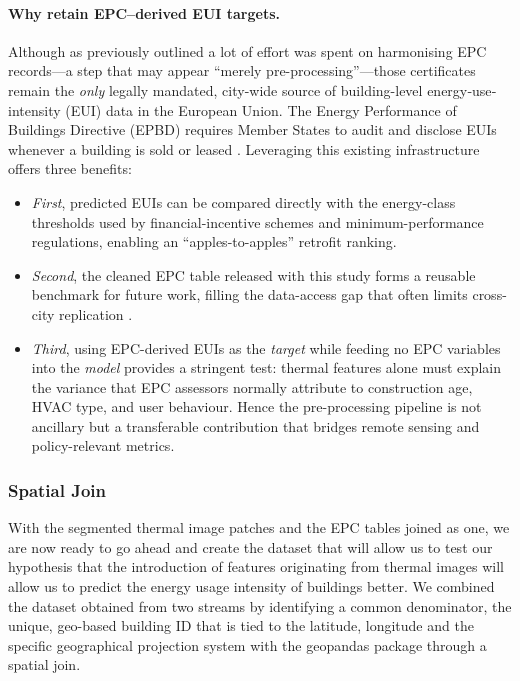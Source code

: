 \documentclass[preprint,12pt]{elsarticle}
\begin{document}
        \paragraph{Why retain EPC--derived EUI targets.} Although as previously outlined a lot of effort was spent on harmonising EPC records---a step that may appear ``merely pre-processing''---those certificates remain the \emph{only} legally mandated, city-wide source of building-level energy‐use‐intensity (EUI) data in the European Union. The Energy Performance of Buildings Directive (EPBD) requires Member States to audit and disclose EUIs whenever a building is sold or leased \citep{EPBD2018_Recast}.  Leveraging this existing infrastructure offers three benefits:
        \begin{itemize}
        \item \emph{First}, predicted EUIs can be compared directly with the energy-class thresholds used by financial-incentive schemes and minimum-performance regulations, enabling an ``apples-to-apples'' retrofit ranking.  
        \item \emph{Second}, the cleaned EPC table released with this study forms a reusable benchmark for future work, filling the data-access gap that often limits cross-city replication \citep{Fabbri2019_EPCreview}.  
        \item \emph{Third}, using EPC-derived EUIs as the \emph{target} while feeding no EPC variables into the \emph{model} provides a stringent test: thermal features alone must explain the variance that EPC assessors normally attribute to construction age, HVAC type, and user behaviour. Hence the pre-processing pipeline is not ancillary but a transferable contribution that bridges remote sensing and policy-relevant metrics.
        \end{itemize}
        

    
    \subsubsection{Spatial Join}%
        With the segmented thermal image patches and the EPC tables joined as one, we are now ready to go ahead and create the dataset that will allow us to test our hypothesis that the introduction of features originating from thermal images will allow us to predict the energy usage intensity of buildings better. 
        We combined the dataset obtained from two streams by identifying a common denominator, the unique, geo-based building ID that is tied to the latitude, longitude and the specific geographical projection system with the geopandas package through a spatial join.%
        
\end{document}
